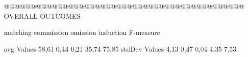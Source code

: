 @@@@@@@@@@@@@@@@@@@@@@@@@@@@@@@@@@@@@@@@@@@@@ OVERALL OUTCOMES

               matching commission   omission  induction  F-measure
               
avg Values      58,61       0,44       0,21      35,74     75,85        
stdDev Values    4,13       0,47       0,04       4,35      7,53        